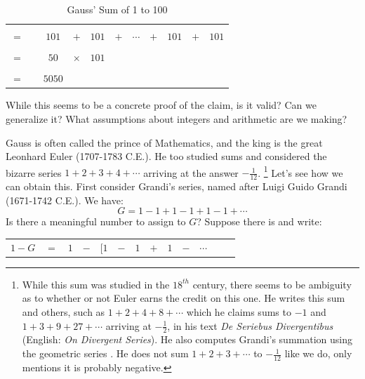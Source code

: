 \begin{example}
\begin{table}[H]
\begin{tabular}{ccccccccccc}
                \hline\\
                $=$&&$101$&$+$&$101$&$+$&$\cdots$&$+$&$101$&$+$&$101$\\
                \hline\\
                $=$&&$50$&$\times$&$101$\\
                \hline\\
                $=$&&$5050$
            \end{tabular}
            \caption{Gauss' Sum of 1 to 100}
        \end{table}
        While this seems to be a concrete proof of the claim, is it valid? Can
        we generalize it? What assumptions about integers and arithmetic are we
        making?
    \end{example}
    \begin{example}
        \label{ex:Logic_Euler_Sum}%
        Gauss is often called the prince of Mathematics, and the king is the
        great Leonhard Euler (1707-1783 C.E.). He too
        studied sums and considered the bizarre series $1+2+3+4+\cdots$ arriving
        at the answer $\minus\frac{1}{12}$.%
        \footnote{%
            While this sum was studied in the $18^{th}$ century, there seems to
            be ambiguity as to whether or not Euler earns the credit on this
            one. He writes this sum and others, such as $1+2+4+8+\cdots$ which
            he claims sums to $\minus{1}$ and $1+3+9+27+\cdots$ arriving at
            $\minus\frac{1}{2}$, in his text \textit{De Seriebus Divergentibus}
            (English: \textit{On Divergent Series}). He also computes Grandi's
            summation using the geometric series
            \cite[p.~206-208]{euler2012seriebus}. He does not sum $1+2+3+\cdots$
            to $\minus\frac{1}{12}$ like we do, only mentions it is probably
            negative.
        }
        Let's see how we can obtain this. First consider Grandi's
        series, named after Luigi Guido Grandi%
         (1671-1742 C.E.). We have:
        \begin{equation}
            G=1-1+1-1+1-1+\cdots
        \end{equation}
        Is there a meaningful number to assign to $G$? Suppose there is and
        write:
        \begin{table}[H]
            \centering
            \captionsetup{type=table}
            \begin{tabular}{rrrrrrrrrrrrr}
                $1-G$&$=$&$1$&$-$&$\Big[$$1$&$-$&$1$&$+$&$1$&$-$&$\cdots$
$$
\end{tabular}
\end{table}
\end{example}
